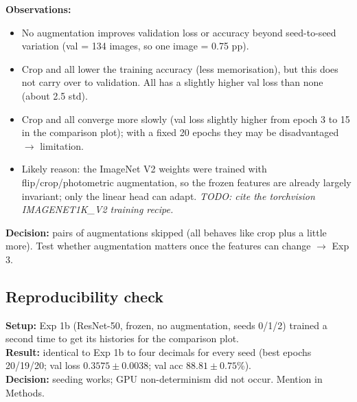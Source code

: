 \textbf{Observations:}
\begin{itemize}
    \item No augmentation improves validation loss or accuracy beyond seed-to-seed variation
          (val = 134 images, so one image = 0.75 pp).
    \item Crop and all lower the training accuracy (less memorisation), but this does not
          carry over to validation. All has a slightly higher val loss than none (about 2.5 std).
    \item Crop and all converge more slowly (val loss slightly higher from epoch 3 to 15 in the
          comparison plot); with a fixed 20 epochs they may be disadvantaged $\rightarrow$ limitation.
    \item Likely reason: the ImageNet V2 weights were trained with flip/crop/photometric augmentation,
          so the frozen features are already largely invariant; only the linear head can adapt.
          \emph{TODO: cite the torchvision IMAGENET1K\_V2 training recipe.}
\end{itemize}
\textbf{Decision:} pairs of augmentations skipped (all behaves like crop plus a little more).
Test whether augmentation matters once the features can change $\rightarrow$ Exp 3.

\subsection*{Reproducibility check}
\textbf{Setup:} Exp 1b (ResNet-50, frozen, no augmentation, seeds 0/1/2) trained a second time to
get its histories for the comparison plot.\\
\textbf{Result:} identical to Exp 1b to four decimals for every seed
(best epochs 20/19/20; val loss $0.3575 \pm 0.0038$; val acc $88.81 \pm 0.75$\%).\\
\textbf{Decision:} seeding works; GPU non-determinism did not occur. Mention in Methods.

